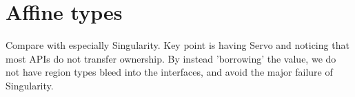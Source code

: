 
\section{Affine types}
\label{sec:affine}

Compare with especially Singularity. Key point is having Servo and noticing that most APIs do not transfer ownership. By instead 'borrowing' the value, we do not have region types bleed into the interfaces, and avoid the major failure of Singularity.

